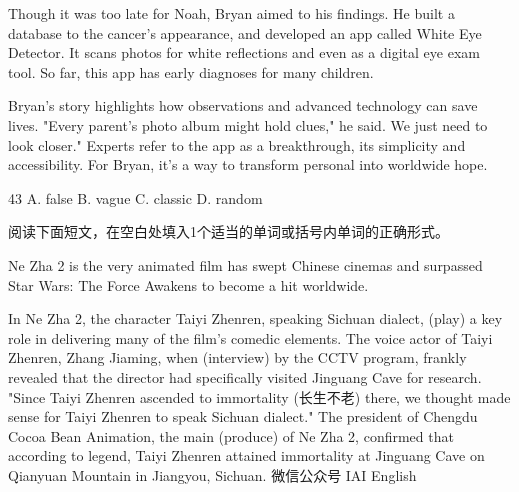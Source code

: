 \documentclass{英语试卷}
\begin{document}
\par Though it was too late for Noah, Bryan aimed to  his findings. He built a database to  the cancer's appearance, and developed an app called White Eye Detector. It scans photos for white reflections and even  as a digital eye exam tool. So far, this app has  early diagnoses for many children.\par
\par Bryan's story highlights how  observations and advanced technology can save lives. "Every parent's photo album might hold  clues," he said. We just need to look closer." Experts refer to the app as a breakthrough,  its simplicity and accessibility. For Bryan, it's a way to transform personal  into worldwide hope.\par
{}
\par 43 A. false B. vague C. classic D. random\par
{}
\par 阅读下面短文，在空白处填入1个适当的单词或括号内单词的正确形式。\par
\par Ne Zha 2 is the very animated film  has swept Chinese cinemas and surpassed Star Wars: The Force Awakens to become a hit worldwide.\par
\par In Ne Zha 2, the character Taiyi Zhenren, speaking Sichuan dialect,  (play) a key role in delivering many of the film's comedic elements. The voice actor of Taiyi Zhenren, Zhang Jiaming, when  (interview) by the CCTV program, frankly revealed that the director had specifically visited Jinguang Cave for research. "Since Taiyi Zhenren ascended to immortality (长生不老) there, we thought  made sense for Taiyi Zhenren to speak Sichuan dialect." The president of Chengdu Cocoa Bean Animation, the main  (produce) of Ne Zha 2, confirmed that according to legend, Taiyi Zhenren attained immortality at Jinguang Cave on Qianyuan Mountain in Jiangyou, Sichuan. 微信公众号 IAI English\par
\end{document}

